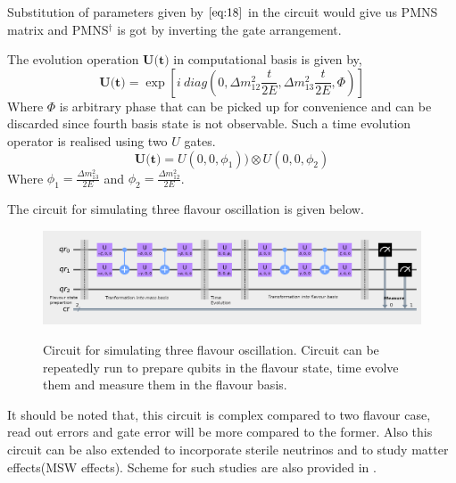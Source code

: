 \documentclass[12pt,a4paper]{report}
\begin{document}
Substitution of parameters given by $\ref{eq:18}$ in the circuit would give us PMNS matrix and PMNS$^{\dagger}$ is got by inverting the gate arrangement.\par
The evolution operation $\textbf{U(t)}$ in computational basis is given by,
\begin{equation}
\textbf{U(t)}=\exp [i \ diag(0,\Delta m_{12}^{2}\frac{t}{2E}, \Delta m_{13}^{2}\frac{t}{2E},\Phi)]
\end{equation}
Where $\Phi$ is arbitrary phase that can be picked up for convenience and can be discarded since fourth basis state is not observable. Such a time evolution operator is realised using two $U$ gates.
\begin{equation}
\textbf{U(t)}= U(0,0,\phi_{1})) \otimes U(0,0,\phi_{2})
\end{equation}
Where $\phi_{1}=\frac{\Delta m_{13}^{2}}{2E}$ and $\phi_{2}=\frac{\Delta m_{12}^{2}}{2E}$.\par
The circuit for simulating three flavour oscillation is given below.
\begin{figure}[h]
\graphicspath{ {./Images/} }
\centering	
{\includegraphics[width=\textwidth]{fig_4.png}}
\caption{Circuit for simulating three flavour oscillation\cite{jones}. Circuit can be repeatedly run to prepare qubits in the flavour state, time evolve them and measure them in the flavour basis.}
\label{fig 4}
\end{figure}

It should be noted that, this circuit is complex compared to two flavour case, read out errors and gate error will be more compared to the former. Also this circuit can be also extended to incorporate sterile neutrinos and to study matter effects(MSW effects). Scheme for such studies are also provided in \cite{jones}.
\end{document}
